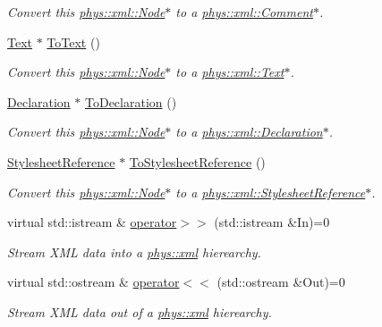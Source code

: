 \begin{DoxyCompactItemize}
\begin{DoxyCompactList}\small\item\em Convert this \hyperlink{classphys_1_1xml_1_1Node}{phys::xml::Node}$\ast$ to a \hyperlink{classphys_1_1xml_1_1Comment}{phys::xml::Comment}$\ast$. \item\end{DoxyCompactList}\item 
\hyperlink{classphys_1_1xml_1_1Text}{Text} $\ast$ \hyperlink{classphys_1_1xml_1_1Node_ad80322226eda62c4f20b795ae72b5511}{ToText} ()
\begin{DoxyCompactList}\small\item\em Convert this \hyperlink{classphys_1_1xml_1_1Node}{phys::xml::Node}$\ast$ to a \hyperlink{classphys_1_1xml_1_1Text}{phys::xml::Text}$\ast$. \item\end{DoxyCompactList}\item 
\hyperlink{classphys_1_1xml_1_1Declaration}{Declaration} $\ast$ \hyperlink{classphys_1_1xml_1_1Node_a1a66c870aedfa8c55e9eca7c76444c22}{ToDeclaration} ()
\begin{DoxyCompactList}\small\item\em Convert this \hyperlink{classphys_1_1xml_1_1Node}{phys::xml::Node}$\ast$ to a \hyperlink{classphys_1_1xml_1_1Declaration}{phys::xml::Declaration}$\ast$. \item\end{DoxyCompactList}\item 
\hyperlink{classphys_1_1xml_1_1StylesheetReference}{StylesheetReference} $\ast$ \hyperlink{classphys_1_1xml_1_1Node_a04b71429d57003f8de9834773bae1956}{ToStylesheetReference} ()
\begin{DoxyCompactList}\small\item\em Convert this \hyperlink{classphys_1_1xml_1_1Node}{phys::xml::Node}$\ast$ to a \hyperlink{classphys_1_1xml_1_1StylesheetReference}{phys::xml::StylesheetReference}$\ast$. \item\end{DoxyCompactList}\item 
virtual std::istream \& \hyperlink{classphys_1_1xml_1_1Node_a400698c30e391c3f098268d4a79d76ca}{operator$>$$>$} (std::istream \&In)=0
\begin{DoxyCompactList}\small\item\em Stream XML data into a \hyperlink{namespacephys_1_1xml}{phys::xml} hierearchy. \item\end{DoxyCompactList}\item 
virtual std::ostream \& \hyperlink{classphys_1_1xml_1_1Node_a62ae8f247d6ae6e5e147b6955b6af0a9}{operator$<$$<$} (std::ostream \&Out)=0
\begin{DoxyCompactList}\small\item\em Stream XML data out of a \hyperlink{namespacephys_1_1xml}{phys::xml} hierearchy. \item\end{DoxyCompactList}\end{DoxyCompactItemize}
